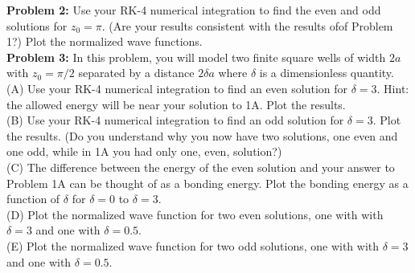 \documentclass[12pt]{book}
\begin{document}
\noindent
    {\bf Problem 2:} Use your RK-4 numerical integration to find the even and odd solutions for $z_0 = \pi$.  (Are your results consistent with the results ofof Problem 1?)  Plot the normalized wave functions.\\[5pt]

\noindent
{\bf Problem 3:}  In this problem, you will model two finite square wells of width $2a$ with $z_0=\pi/2$ separated by a distance $2 \delta a$ where $\delta$ is a dimensionless quantity.\\[5pt]

\noindent
(A) Use your RK-4 numerical integration to find an even solution for $\delta=3$.  Hint: the allowed energy will be near your solution to 1A.  Plot the results.\\[5pt]

\noindent
(B) Use your RK-4 numerical integration to find an odd solution for
$\delta=3$. Plot the results.  (Do you understand why you now have two
solutions, one even and one odd, while in 1A you had only one, even,
solution?)\\[5pt]

\noindent
(C) The difference between the energy of the even solution and your answer to Problem 1A can be thought of as a bonding energy.  Plot the bonding energy as a function of $\delta$ for $\delta=0$ to $\delta=3$.\\[5pt]

\noindent
(D) Plot the normalized wave function for two even solutions, one with with $\delta=3$ and one with $\delta=0.5$.\\[5pt] 

\noindent
(E) Plot the normalized wave function for two odd solutions, one with with $\delta=3$ and one with $\delta=0.5$.  
\end{document}
